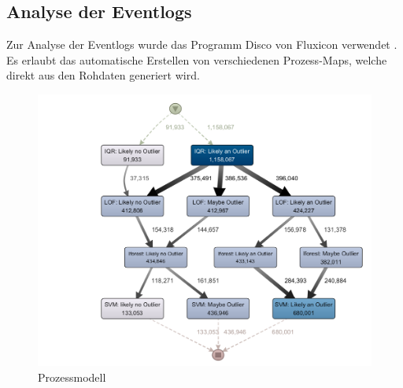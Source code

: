 \subsection{Analyse der Eventlogs}
Zur Analyse der Eventlogs wurde das Programm Disco von Fluxicon verwendet \cite{ProcessMiningAutomated}. Es erlaubt das automatische Erstellen von verschiedenen Prozess-Maps, welche direkt aus den Rohdaten generiert wird. 
\begin{figure}[h!]
	\includegraphics[width=\textwidth]{img/Prozessmodell.png}
	\caption[Prozessmodell]{Prozessmodell}
	\label{fig:Prozessmodell}
\end{figure}